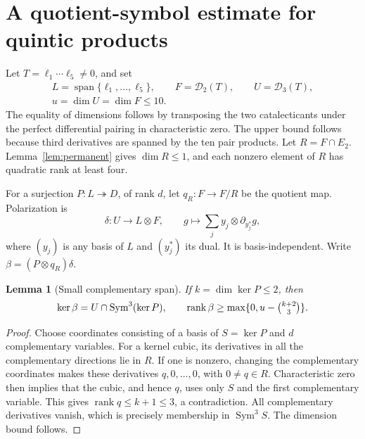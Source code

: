 \documentclass[11pt]{amsart}
\newtheorem{lemma}[theorem]{Lemma}
\theoremstyle{definition}
\numberwithin{equation}{section}
\newcommand{\Sym}{\operatorname{Sym}}
\newcommand{\Span}{\operatorname{span}}
\newcommand{\rank}{\operatorname{rank}}
\newcommand{\cD}{\mathcal D}
\begin{document}
\section{A quotient-symbol estimate for quintic products}
Let \(T=\ell_1\cdots\ell_5\ne0\), and set
\[
 \begin{gathered}
 L=\Span\{\ell_1,\ldots,\ell_5\},\qquad
 F=\cD_2(T),\qquad U=\cD_3(T),\\
 u=\dim U=\dim F\le10.
 \end{gathered}
\]
The equality of dimensions follows by transposing the two catalecticants
under the perfect differential pairing in characteristic zero. The upper
bound follows because third derivatives are spanned by the ten pair products.
Let \(R=F\cap E_2\). Lemma~\ref{lem:permanent} gives \(\dim R\le1\),
and each nonzero element of \(R\) has quadratic rank at least four.

For a surjection \(P:L\twoheadrightarrow D\), of rank \(d\), let
\(q_R:F\to F/R\) be the quotient map. Polarization is
\[
 \delta:U\longrightarrow L\otimes F,\qquad
 g\longmapsto\sum_j y_j\otimes\partial_{y_j^*}g,
\]
where \((y_j)\) is any basis of \(L\) and \((y_j^*)\) its dual.
It is basis-independent. Write \(\beta=(P\otimes q_R)\delta\).

\begin{lemma}[Small complementary span]\label{lem:kernel}
If \(k=\dim\ker P\le2\), then
\[
 \ker\beta=U\cap\Sym^3(\ker P),\qquad
 \rank\beta\ge\max\{0,u-\tbinom{k+2}{3}\}.
\]
\end{lemma}
\begin{proof}
Choose coordinates consisting of a basis of \(S=\ker P\) and \(d\)
complementary variables. For a kernel cubic, its derivatives in all the
complementary directions lie in \(R\). If one is nonzero, changing the
complementary coordinates makes these derivatives \(q,0,\ldots,0\),
with \(0\ne q\in R\). Characteristic zero then implies that the cubic,
and hence \(q\), uses only \(S\) and the first complementary variable.
This gives \(\rank q\le k+1\le3\), a contradiction. All complementary
derivatives vanish, which is precisely membership in \(\Sym^3S\).
The dimension bound follows.
\end{proof}
\end{document}
